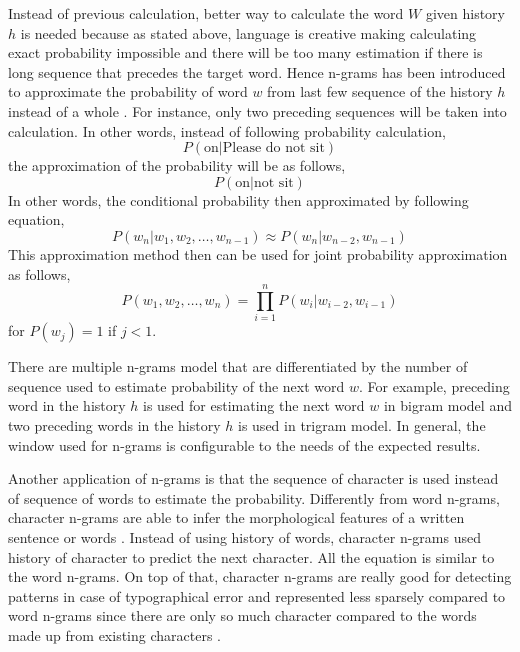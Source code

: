    Instead of previous calculation, better way to calculate the word
    $W$ given history $h$ is needed because as stated above, language
    is creative making calculating exact probability impossible and
    there will be too many estimation if there is long sequence that
    precedes the target word. Hence n-grams has been introduced to
    approximate the probability of word $w$ from last few sequence of
    the history $h$ instead of a whole
    \citep{speech2009Jurafsky:2009:SLP:1214993}. For instance, only
    two preceding sequences will be taken into calculation.
    In other words, instead of following probability calculation,
    \begin{equation}
        P(\text{on} \vert \text{Please do not sit})
    \end{equation}
    the approximation of the probability will be as follows,
    \begin{equation}
        P(\text{on} \vert \text{not sit})
    \end{equation}
    In other words, the conditional probability then approximated by
    following equation,
    \begin{equation}
        \label{eq:condprobapprox}
        P(w_n \vert w_1, w_2, \dots, w_{n-1}) \approx P(w_n \vert w_{n-2}, w_{n-1})
    \end{equation}
    This approximation method then can be used for joint probability
    approximation as follows,
    \begin{equation}
        P(w_1, w_2, \dots, w_n) = \prod_{i=1}^n P(w_i \vert w_{i-2}, w_{i-1})
    \end{equation}
    for $P(w_j) = 1$ if $j < 1$.

    There are multiple n-grams model that are differentiated by the number
    of sequence used to estimate probability of the next word $w$. For
    example, preceding word in the history $h$ is used for estimating
    the next word $w$ in bigram model and two preceding words in the
    history $h$ is used in trigram model. In general, the window used
    for n-grams is configurable to the needs of the expected results.
    
    Another application of n-grams is that the sequence of character
    is used instead of sequence of words to estimate the probability.
    Differently from word n-grams, character n-grams are able to infer
    the morphological features of a written sentence or words
    \citep{kulmizev-etal-2017-power}. Instead of using history of
    words, character n-grams used history of character to predict the
    next character. All the equation is similar to the word n-grams. On
    top of that, character n-grams are really good for detecting
    patterns in case of typographical error and represented less
    sparsely compared to word n-grams since there are only so much
    character compared to the words made up from existing characters
    \citep{kulmizev-etal-2017-power}.